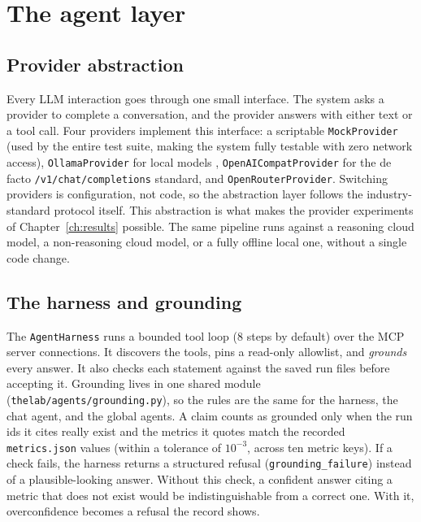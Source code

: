 \section{The agent layer}
\label{sec:agents}

\subsection{Provider abstraction}

Every LLM interaction goes through one small interface. The system asks a provider to complete a conversation, and the provider answers with either text or a tool call. Four providers implement this interface: a scriptable \texttt{MockProvider} (used by the entire test suite, making the system fully testable with zero network access), \texttt{OllamaProvider} for local models \cite{ollama2024}, \texttt{OpenAICompatProvider} for the de facto \texttt{/v1/chat/completions} standard, and \texttt{OpenRouterProvider}. Switching providers is configuration, not code, so the abstraction layer follows the industry-standard protocol itself. This abstraction is what makes the provider experiments of Chapter~\ref{ch:results} possible. The same pipeline runs against a reasoning cloud model, a non-reasoning cloud model, or a fully offline local one, without a single code change.

\subsection{The harness and grounding}

The \texttt{AgentHarness} runs a bounded tool loop (8 steps by default) over the MCP server connections. It discovers the tools, pins a read-only
allowlist, and \emph{grounds} every answer. It also checks each statement against the saved run files before accepting it. Grounding lives in one shared module (\texttt{thelab/agents/grounding.py}), so the rules are the same for the harness, the chat agent, and the global agents. A claim counts as grounded only when the run ids it cites really exist and the metrics it quotes match the recorded \texttt{metrics.json} values (within a tolerance of $10^{-3}$, across ten metric keys). If a check fails, the harness returns a structured refusal (\texttt{grounding\_failure}) instead of a plausible-looking answer. Without this check, a confident answer citing a metric that does not exist would be indistinguishable from a correct one. With it, overconfidence becomes a refusal the record shows.

